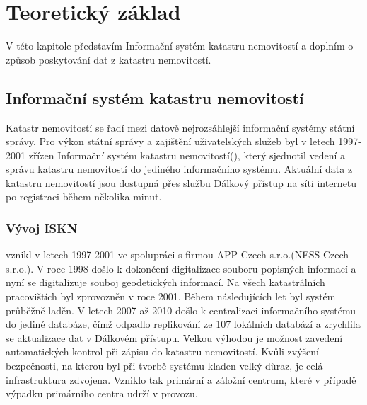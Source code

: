\chapter{Teoretický základ}
\label{2-teorie}
V této kapitole představím Informační systém katastru nemovitostí a doplním o způsob poskytování dat z katastru nemovitostí.

\section{Informační systém katastru nemovitostí}
Katastr nemovitostí se řadí mezi datově nejrozsáhlejší informační systémy státní správy. Pro výkon státní správy a zajištění uživatelských služeb byl v letech 1997-2001 zřízen Informační systém katastru nemovitostí(), který sjednotil vedení a správu katastru nemovitostí do jediného informačního systému. Aktuální data z katastru nemovitostí jsou dostupná přes službu Dálkový přístup na síti internetu po registraci během několika minut. 
\subsection{Vývoj ISKN}
 vznikl v letech 1997-2001 ve spolupráci s firmou APP Czech s.r.o.(NESS Czech s.r.o.). V roce 1998 došlo k dokončení digitalizace souboru popisných informací a nyní se digitalizuje souboj geodetických informací. Na všech katastrálních pracovištích byl  zprovozněn v roce 2001. Během následujících let byl systém průběžně laděn. V letech 2007 až 2010 došlo k centralizaci informačního systému do jediné databáze, čímž odpadlo replikování ze 107 lokálních databází a zrychlila se aktualizace dat v Dálkovém přístupu. Velkou výhodou  je možnost zavedení automatických kontrol při zápisu do katastru nemovitostí. Kvůli zvýšení bezpečnosti, na kterou byl při tvorbě systému kladen velký důraz, je celá infrastruktura zdvojena. Vzniklo tak primární a záložní centrum, které v případě výpadku primárního centra udrží  v provozu.
